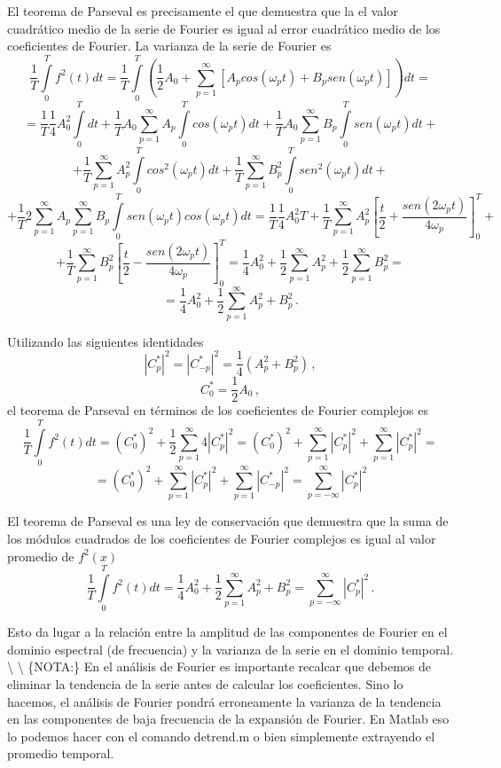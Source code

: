 \documentclass[
]{agujournal2019}
\begin{document}
El teorema de Parseval es precisamente el que demuestra que la el valor
cuadrático medio de la serie de Fourier es igual al error cuadrático
medio de los coeficientes de Fourier. La varianza de la serie de Fourier
es \[\frac{1}{T}\int\limits^{T}_0 f^2(t) dt=\frac{1}{T}\int\limits^{T}_0
\left(\frac{1}{2}A_0 +\sum\limits^\infty_{p=1}[A_p cos(\omega_p t) + B_p sen(\omega_p t)]\right) dt=\]
\[=\frac{1}{T}\frac{1}{4} A^2_0 \int\limits^{T}_0 dt + \frac{1}{T}A_0 \sum\limits^\infty_{p=1} A_p \int\limits^{T}_0 cos(\omega_p t)dt + \frac{1}{T}A_0\sum\limits^\infty_{p=1}B_p \int\limits^{T}_0 sen(\omega_p t)dt +\]
\[+\frac{1}{T}\sum\limits^\infty_{p=1}A^2_p \int\limits^{T}_0 cos^2(\omega_p t)dt +
\frac{1}{T}\sum\limits^\infty_{p=1}B^2_p \int\limits^{T}_0 sen^2(\omega_p t)dt+\]
\[+\frac{1}{T}2\sum\limits^\infty_{p=1}A_p \sum\limits^\infty_{p=1}B_p\int\limits^{T}_0 sen(\omega_p t)cos(\omega_p t)dt=
\frac{1}{T}\frac{1}{4}A^2_0 T + \frac{1}{T}\sum\limits^\infty_{p=1}A^2_p\left[ \frac{t}{2} + \frac{sen(2\omega_p t)}{4\omega_p}\right]^T_0+\]
\[+\frac{1}{T}\sum\limits^\infty_{p=1}B^2_p\left[ \frac{t}{2} - \frac{sen(2\omega_p t)}{4\omega_p}\right]^T_0=
\frac{1}{4}A^2_0 + \frac{1}{2}\sum\limits^\infty_{p=1}A_p^2 + \frac{1}{2}\sum\limits^\infty_{p=1}B_p^2=\]
\[=\frac{1}{4}A^2_0 + \frac{1}{2}\sum\limits^\infty_{p=1} A_p^2 + B_p^2\,.\]

Utilizando las siguientes identidades
\[|C^*_p|^2=|C^*_{-p}|^2=\frac{1}{4}(A_p^2 + B_p^2)\,,\]
\[C^*_0=\frac{1}{2}A_0\,,\] el teorema de Parseval en términos de los
coeficientes de Fourier complejos es
\[\frac{1}{T}\int\limits^{T}_0 f^2(t) dt=(C^*_0)^2 + \frac{1}{2}\sum\limits^\infty_{p=1} 4|C^*_p|^2=
(C^*_0)^2 + \sum\limits^\infty_{p=1} |C^*_p|^2 + \sum\limits^\infty_{p=1} |C^*_p|^2=\]
\[=(C^*_0)^2 + \sum\limits^\infty_{p=1} |C^*_p|^2 + \sum\limits^\infty_{p=1} |C^*_{-p}|^2=
\sum\limits^\infty_{p=-\infty} |C^*_p|^2\]

\newpage

\begin{framed}
El teorema de Parseval es una
ley de conservación que demuestra que la suma de los módulos cuadrados
de los coeficientes de Fourier complejos es igual al valor promedio de
$f^2(x)$
$$\frac{1}{T}\int\limits^{T}_0 f^2(t) dt=\frac{1}{4}A^2_0 + \frac{1}{2}\sum\limits^\infty_{p=1} A_p^2 + B_p^2=
\sum\limits^\infty_{p=-\infty} |C^*_p|^2\,.$$
\end{framed}

Esto da lugar a la relación entre la amplitud de las componentes de
Fourier en el dominio espectral (de frecuencia) y la varianza de la
serie en el dominio temporal. \textbackslash{} \textbackslash{}
\{\textbf \noindent NOTA:\} En el análisis de Fourier es importante
recalcar que debemos de eliminar la tendencia de la serie antes de
calcular los coeficientes. Sino lo hacemos, el análisis de Fourier
pondrá erroneamente la varianza de la tendencia en las componentes de
baja frecuencia de la expansión de Fourier. En Matlab eso lo podemos
hacer con el comando detrend.m o bien simplemente extrayendo el promedio
temporal.
\end{document}
